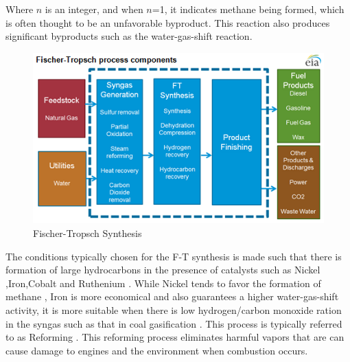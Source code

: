 
Where $n$ is an integer, and when $n$=1, it indicates methane being formed, which is often thought to be an unfavorable byproduct. This reaction also produces significant byproducts such as the water-gas-shift reaction. 

\begin{figure}[ht]
    \centering
    \includegraphics{images/chart2.png}
    \caption{Fischer-Tropsch Synthesis \cite{Mallik2014Gas-to_liquidsMarket}}
    \label{fig:F-T synthesis}
\end{figure}
The conditions typically chosen for the F-T synthesis is made such that there is formation of large hydrocarbons in the presence of catalysts such as Nickel ,Iron,Cobalt and Ruthenium . While Nickel tends to favor the formation of methane , Iron is more economical and also guarantees a higher water-gas-shift activity, it is more suitable when there is low hydrogen/carbon monoxide ration in the syngas such as that in coal gasification \cite{Schulz1999ShortSynthesis}. This process is typically referred to as Reforming \cite{Boogaard2017ToxicologicalToxicology}. This reforming process eliminates harmful vapors that are can cause damage to engines and the environment when combustion occurs. 


